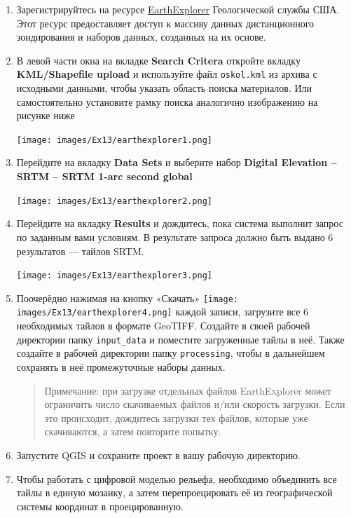 \documentclass[
  12pt,
]{book}
\begin{document}
\begin{enumerate}
\def\labelenumi{\arabic{enumi}.}
\item
  Зарегистрируйтесь на ресурсе \href{https://earthexplorer.usgs.gov/}{EarthExplorer} Геологической службы США. Этот ресурс предоставляет доступ к массиву данных дистанционного зондирования и наборов данных, созданных на их основе.
\item
  В левой части окна на вкладке \textbf{Search Critera} откройте вкладку \textbf{KML/Shapefile upload} и используйте файл \texttt{oskol.kml} из архива с исходными данными, чтобы указать область поиска материалов. Или самостоятельно установите рамку поиска аналогично изображению на рисунке ниже

  \texttt{[image: images/Ex13/earthexplorer1.png]}
\item
  Перейдите на вкладку \textbf{Data Sets} и выберите набор \textbf{Digital Elevation -- SRTM -- SRTM 1-arc second global}

  \texttt{[image: images/Ex13/earthexplorer2.png]}
\item
  Перейдите на вкладку \textbf{Results} и дождитесь, пока система выполнит запрос по заданным вами условиям. В результате запроса должно быть выдано 6 результатов --- тайлов SRTM.

  \texttt{[image: images/Ex13/earthexplorer3.png]}
\item
  Поочерёдно нажимая на кнопку «Скачать» \texttt{[image: images/Ex13/earthexplorer4.png]} каждой записи, загрузите все 6 необходимых тайлов в формате GeoTIFF. Создайте в своей рабочей директории папку \texttt{input\_data} и поместите загруженные тайлы в неё. Также создайте в рабочей директории папку \texttt{processing}, чтобы в дальнейшем сохранять в неё промежуточные наборы данных.

  \begin{quote}
  Примечание: при загрузке отдельных файлов EarthExplorer может ограничить число скачиваемых файлов и/или скорость загрузки. Если это происходит, дождитесь загрузки тех файлов, которые уже скачиваются, а затем повторите попытку.
  \end{quote}
\item
  Запустите QGIS и сохраните проект в вашу рабочую директорию.
\item
  Чтобы работать с цифровой моделью рельефа, необходимо объединить все тайлы в единую мозаику, а затем перепроецировать её из географической системы координат в проецированную.


\end{enumerate}
\end{document}
